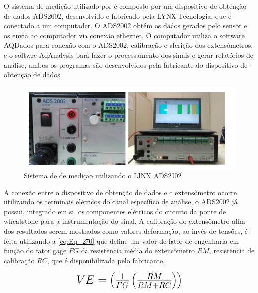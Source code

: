 O sistema de medição utilizado por \autocite{Minela2017} é composto por um dispositivo de obtenção de dados ADS2002, desenvolvido e fabricado pela LYNX Tecnologia,
que é conectado a um computador. O ADS2002 obtém os dados gerados pelo sensor e os envia ao computador via conexão ethernet.
O computador utiliza o software AQDados para conexão com o ADS2002, calibração e aferição dos extensômetros, e o softwre AqAnalysis para fazer o processamento dos sinais
e gerar relatórios de análise, ambos os programas são desenvolvidos pela fabricante do dispositivo de obtenção de dados.

\begin{figure}[htb]
	\caption{\label{fig:2060} Sistema de de medição utilizando o LINX ADS2002}
	\begin{center}
		\includegraphics[width=\textwidth]{pictures/2060.png}
	\end{center}
\end{figure}

A conexão entre o dispositivo de obtenção de dados e o extensômetro ocorre utilizando os terminais elétricos do canal específico de análise, o ADS2002 já possui,
integrado em si, os componentes elétricos do circuito da ponte de wheatstone para a instrumentação do sinal.
A calibração do extensômetro afim dos resultados serem mostrados como valores deformação, ao invés de tensões, é feita utilizando a \autoref{eq:Eq_270} que define um valor de
fator de engenharia em função do fator gage $FG$ da resistência média do extensômetro $RM$, resistência de calibração $RC$, que é disponibilizada pelo fabricante.

\begin{equation}\label{eq:Eq_270}%
\mbox{\fontsize{17.28}{21.6}\selectfont\( %
VE = \left ( \frac{1}{FG}\left ( \frac{RM}{RM + RC} \right ) \right )
\)} %
\end{equation}

\newline


